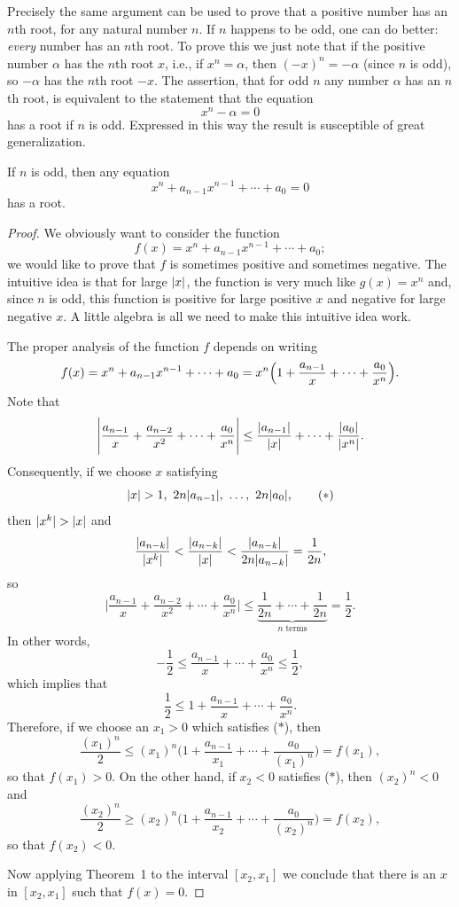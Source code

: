 Precisely the same argument can be used to prove that a positive number has an
$n$th root, for any natural number $n$. If $n$ happens to be odd, one can do
better: \emph{every} number has an $n$th root. To prove this we just note that
if the positive number $\alpha$ has the $n$th root $x$, i.e., if $x^n=\alpha$,
then $(-x)^n=-\alpha$ (since $n$ is odd), so $-\alpha$ has the $n$th root $-x$.
The assertion, that for odd $n$ any number $\alpha$ has an $n$th root, is
equivalent to the statement that the equation
\[
x^n-\alpha=0
\]
has a root if $n$ is odd. Expressed in this way the result is susceptible of
great generalization.

\begin{theorem}
If $n$ is odd, then any equation
\[
x^n + a_{n-1}x^{n-1} + \cdots + a_0 = 0
\]
has a root.
\end{theorem}

\begin{proof}
We obviously want to consider the function
\[
f(x)=x^n + a_{n-1}x^{n-1} + \cdots + a_0;
\]
we would like to prove that $f$ is sometimes positive and sometimes negative.
The intuitive idea is that for large $\lvert x\rvert$, the function is very much like
$g(x)=x^n$ and, since $n$ is odd, this function is positive for large positive
$x$ and negative for large negative $x$. A little algebra is all we need to
make this intuitive idea work.

The proper analysis of the function $f$ depends on writing
\[
f(x)=x^n + a_{n-1}x^{n-1} + \cdots + a_0
= x^n\Bigl(1 + \frac{a_{n-1}}{x} + \cdots + \frac{a_0}{x^n}\Bigr).
\]
Note that
\[
\Biggl\lvert \frac{a_{n-1}}{x} + \frac{a_{n-2}}{x^2} + \cdots + \frac{a_0}{x^n}
\Biggr\rvert
\leq \frac{\lvert a_{n-1}\rvert}{\lvert x\rvert} + \cdots + \frac{\lvert a_0\rvert}{\lvert x^n\rvert}.
\]
Consequently, if we choose $x$ satisfying
\begin{equation*}
\abs{x}>1,\ 2n\abs{a_{n-1}},\ \dots,\ 2n\abs{a_0}, \tag{$*$}
\end{equation*}
then $\lvert x^k\rvert>\lvert x\rvert$ and
\[
\frac{\lvert a_{n-k}\rvert}{\lvert x^k\rvert}
< \frac{\lvert a_{n-k}\rvert}{\lvert x\rvert}
< \frac{\lvert a_{n-k}\rvert}{2n\lvert a_{n-k}\rvert}
= \frac{1}{2n},
\]
so
\[
\Biggl\lvert \frac{a_{n-1}}{x} + \frac{a_{n-2}}{x^2} + \cdots + \frac{a_0}{x^n}
\Biggr\rvert
\leq \underbrace{\frac{1}{2n}+\cdots+\frac{1}{2n}}_{n\text{ terms}}
= \frac12.
\]
In other words,
\[
-\frac12 \leq \frac{a_{n-1}}{x} + \cdots + \frac{a_0}{x^n} \leq \frac12,
\]
which implies that
\[
\frac12 \leq 1 + \frac{a_{n-1}}{x} + \cdots + \frac{a_0}{x^n}.
\]
Therefore, if we choose an $x_1>0$ which satisfies ($*$), then
\[
\frac{(x_1)^n}{2}
\leq (x_1)^n\Biggl(1 + \frac{a_{n-1}}{x_1} + \cdots + \frac{a_0}{(x_1)^n}\Biggr)
= f(x_1),
\]
so that $f(x_1)>0$. On the other hand, if $x_2<0$ satisfies ($*$), then
$(x_2)^n<0$ and
\[
\frac{(x_2)^n}{2}
\geq (x_2)^n\Biggl(1 + \frac{a_{n-1}}{x_2} + \cdots + \frac{a_0}{(x_2)^n}\Biggr)
= f(x_2),
\]
so that $f(x_2)<0$.

Now applying Theorem~1 to the interval $[x_2,x_1]$ we conclude that there is an
$x$ in $[x_2,x_1]$ such that $f(x)=0$.
\end{proof}

